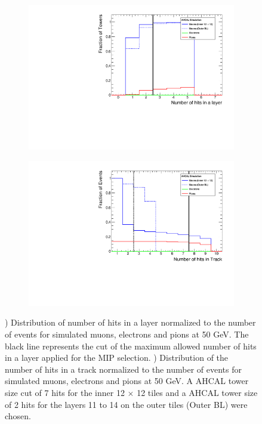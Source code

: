 \begin{figure}[htbp!]
	\begin{subfigure}[t]{0.5\textwidth}
		\centering
		\includegraphics[width=1\linewidth]{../Thesis_Plots/Timing/Muons/Plots/TrackFinderCut_nHitsLayer_Muons}
		\caption{} \label{fig:Muons_Track_nHitsLayer}
	\end{subfigure}
	\hfill
	\begin{subfigure}[t]{0.5\textwidth}
		\centering
		\includegraphics[width=1\linewidth]{../Thesis_Plots/Timing/Muons/Plots/TrackFinderCut_nHitsTrack_Muons}
		\caption{} \label{fig:Muons_Track_nHits}
	\end{subfigure}
	\caption{) Distribution of number of hits in a layer normalized to the number of events for simulated muons, electrons and pions at 50 GeV. The black line represents the cut of the maximum allowed number of hits in a layer applied for the MIP selection. ) Distribution of the number of hits in a track normalized to the number of events for simulated muons, electrons and pions at 50 GeV. A AHCAL tower size cut of 7 hits for the inner 12 $\times$ 12 tiles and a AHCAL tower size of 2 hits for the layers 11 to 14 on the outer tiles (Outer BL) were chosen.}
\end{figure}

